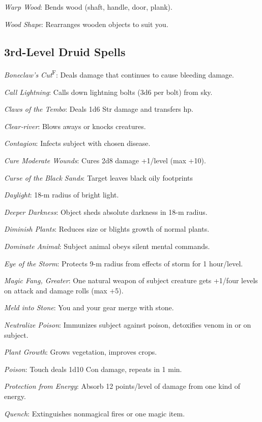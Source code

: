 \textit{Warp Wood}: Bends wood (shaft, handle, door, plank).

\textit{Wood Shape}: Rearranges wooden objects to suit you.



\subsection{3rd-Level Druid Spells}

\textit{Boneclaw's Cut}\textsuperscript{F}: Deals damage that continues to cause bleeding damage.

\textit{Call Lightning}: Calls down lightning bolts (3d6 per bolt) from sky.

\textit{Claws of the Tembo}: Deals 1d6 Str damage and transfers hp.

\textit{Clear‐river}: Blows aways or knocks creatures.

\textit{Contagion}: Infects subject with chosen disease.

\textit{Cure Moderate Wounds}: Cures 2d8 damage +1/level (max +10).

\textit{Curse of the Black Sands}: Target leaves black oily footprints

\textit{Daylight}: 18-m radius of bright light.

\textit{Deeper Darkness}: Object sheds absolute darkness in 18-m radius.

\textit{Diminish Plants}: Reduces size or blights growth of normal plants.

\textit{Dominate Animal}: Subject animal obeys silent mental commands.

\textit{Eye of the Storm}: Protects 9-m radius from effects of storm for 1 hour/level.

\textit{Magic Fang, Greater}: One natural weapon of subject creature gets +1/four levels on attack and damage rolls (max +5).

\textit{Meld into Stone}: You and your gear merge with stone.

\textit{Neutralize Poison}: Immunizes subject against poison, detoxifies venom in or on subject.

\textit{Plant Growth}: Grows vegetation, improves crops.

\textit{Poison}: Touch deals 1d10 Con damage, repeats in 1 min.

\textit{Protection from Energy}: Absorb 12 points/level of damage from one kind of energy.

\textit{Quench}: Extinguishes nonmagical fires or one magic item.

